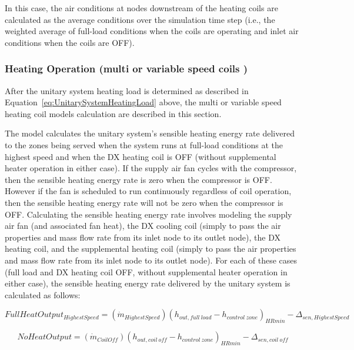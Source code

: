 In this case, the air conditions at nodes downstream of the heating coils are calculated as the average conditions over the simulation time step (i.e., the weighted average of full-load conditions when the coils are operating and inlet air conditions when the coils are OFF).

\subsubsection{Heating Operation (multi or variable speed coils )}\label{heating-operation-multi-or-variable-speed-coils}

After the unitary system heating load is determined as described in Equation~\ref{eq:UnitarySystemHeatingLoad} above, the multi or variable speed heating coil models calculation are described in this section.

The model calculates the unitary system's sensible heating energy rate delivered to the zones being served when the system runs at full-load conditions at the highest speed and when the DX heating coil is OFF (without supplemental heater operation in either case). If the supply air fan cycles with the compressor, then the sensible heating energy rate is zero when the compressor is OFF. However if the fan is scheduled to run continuously regardless of coil operation, then the sensible heating energy rate will not be zero when the compressor is OFF. Calculating the sensible heating energy rate involves modeling the supply air fan (and associated fan heat), the DX cooling coil (simply to pass the air properties and mass flow rate from its inlet node to its outlet node), the DX heating coil, and the supplemental heating coil (simply to pass the air properties and mass flow rate from its inlet node to its outlet node). For each of these cases (full load and DX heating coil OFF, without supplemental heater operation in either case), the sensible heating energy rate delivered by the unitary system is calculated as follows:

\begin{equation}
FullHeatOutpu{t_{HighestSpeed}} = ({\dot m_{HighestSpeed}}){({h_{out,full~load}} - {h_{control~zone}})_{HRmin}} - {\Delta_{sen,HighestSpeed}}
\end{equation}

\begin{equation}
NoHeatOutput = ({\dot m_{CoilOff}}){({h_{out,coil~off}} - {h_{control~zone}})_{HRmin}} - {\Delta_{sen,coil~off}}
\end{equation}

